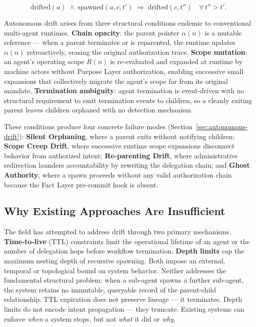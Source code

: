 \begin{equation}
\mathrm{drifted}(a) \;\land\; \mathrm{spawned}(a, c, t') \;\Longrightarrow\; \mathrm{drifted}(c, t'')\quad \forall\, t'' > t'.
\label{eq:intro-drift-cascade}
\end{equation}

Autonomous drift arises from three structural conditions endemic to conventional multi-agent runtimes. \textbf{Chain opacity}: the parent pointer $\alpha(n)$ is a mutable reference — when a parent terminates or is reparented, the runtime updates $\alpha(n)$ retroactively, erasing the original authorization trace. \textbf{Scope mutation}: an agent's operating scope $R(n)$ is re-evaluated and expanded at runtime by machine actors without Purpose Layer authorization, enabling successive small expansions that collectively migrate the agent's scope far from its original mandate. \textbf{Termination ambiguity}: agent termination is event-driven with no structural requirement to emit termination events to children, so a cleanly exiting parent leaves children orphaned with no detection mechanism.

These conditions produce four concrete failure modes (Section~\ref{sec:autonomous-drift}): \textbf{Silent Orphaning}, where a parent exits without notifying children; \textbf{Scope Creep Drift}, where successive runtime scope expansions disconnect behavior from authorized intent; \textbf{Re-parenting Drift}, where administrative redirection launders accountability by rewriting the delegation chain; and \textbf{Ghost Authority}, where a spawn proceeds without any valid authorization chain because the Fact Layer pre-commit hook is absent.

\subsection{Why Existing Approaches Are Insufficient}
\label{sec:intro-insufficient}

The field has attempted to address drift through two primary mechanisms. \textbf{Time-to-live} (TTL) constraints limit the operational lifetime of an agent or the number of delegation hops before workflow termination. \textbf{Depth limits} cap the maximum nesting depth of recursive spawning. Both impose an external, temporal or topological bound on system behavior. Neither addresses the fundamental structural problem: when a sub-agent spawns a further sub-agent, the system retains no immutable, queryable record of the parent-child relationship. TTL expiration does not preserve lineage — it terminates. Depth limits do not encode intent propagation — they truncate. Existing systems can enforce \emph{when} a system stops, but not \emph{what} it did or \emph{why}.

